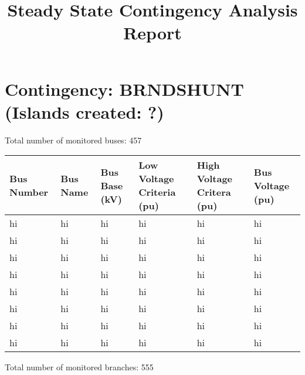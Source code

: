 \documentclass{article}%
\begin{document}
%
\normalsize%
\title{Steady State Contingency Analysis Report}%
\maketitle%
\section*{Contingency: BRNDSHUNT (Islands created: ?)}%
\label{sec:ContingencyBRNDSHUNT(Islandscreated?)}%
Total number of monitored buses: 457%
\newline%
%
\begin{tabular}{| l | l | l | l | l | l |}%
\hline%
Bus Number&Bus Name&Bus Base (kV)&Low Voltage Criteria (pu)&High Voltage Critera (pu)&Bus Voltage (pu)\\%
\hline%
hi&hi&hi&hi&hi&hi\\%
\hline%
hi&hi&hi&hi&hi&hi\\%
\hline%
hi&hi&hi&hi&hi&hi\\%
\hline%
hi&hi&hi&hi&hi&hi\\%
\hline%
hi&hi&hi&hi&hi&hi\\%
\hline%
hi&hi&hi&hi&hi&hi\\%
\hline%
hi&hi&hi&hi&hi&hi\\%
\hline%
hi&hi&hi&hi&hi&hi\\%
\hline%
\end{tabular}%
\newline%
%
Total number of monitored branches: 555

%
\end{document}
